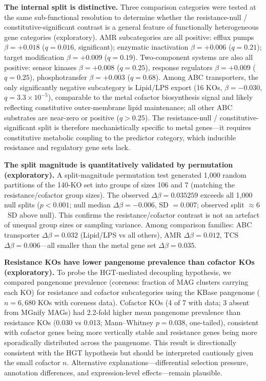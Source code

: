 \documentclass[times]{zHenriquesLab-StyleBioRxiv}
\begin{document}
\textbf{The internal split is distinctive.} Three comparison categories were
tested at the same sub-functional resolution to determine whether the
resistance-null / constitutive-significant contrast is a general feature of
functionally heterogeneous gene categories (exploratory). AMR
subcategories are all positive: efflux pumps $\beta = +0.018$ ($q = 0.016$,
significant); enzymatic inactivation $\beta = +0.006$ ($q = 0.21$); target
modification $\beta = +0.009$ ($q = 0.19$). Two-component systems are also all
positive: sensor kinases $\beta = +0.008$ ($q = 0.25$), response regulators
$\beta = +0.009$ ($q = 0.25$), phosphotransfer $\beta = +0.003$ ($q = 0.68$).
Among ABC transporters, the only significantly negative subcategory is Lipid/LPS
export (16 KOs, $\beta = -0.030$, $q = 3.3 \times 10^{-5}$), comparable to
the metal cofactor biosynthesis signal and likely reflecting constitutive
outer-membrane lipid maintenance; all other ABC
substrates are near-zero or positive ($q > 0.25$). The resistance-null /
constitutive-significant split is therefore mechanistically specific to metal
genes---it requires constitutive metabolic coupling to the predictor category,
which inducible resistance and regulatory gene sets lack.

\textbf{The split magnitude is quantitatively validated by permutation (exploratory).} A split-magnitude permutation test generated 1,000 random
partitions of the 140-KO set into groups of sizes 106 and 7 (matching the
resistance/cofactor group sizes). The observed $\Delta\beta = 0.035259$
exceeds all 1,000 null splits ($p < 0.001$; null median $\Delta\beta =
-0.006$, SD $= 0.007$; observed split $\approx 6$~SD above null). This
confirms the resistance/cofactor contrast is not an artefact of unequal group
sizes or sampling variance. Among comparison families: ABC transporter $\Delta\beta
= 0.032$ (Lipid/LPS vs all others), AMR $\Delta\beta = 0.012$, TCS $\Delta\beta
= 0.006$---all smaller than the metal gene set $\Delta\beta = 0.035$.

\textbf{Resistance KOs have lower pangenome prevalence than cofactor KOs (exploratory).}
To probe the HGT-mediated decoupling hypothesis, we compared pangenome prevalence
(coreness: fraction of MAG clusters carrying each KO) for resistance and cofactor
subcategories using the KBase pangenome ($n = 6{,}680$ KOs with coreness data).
Cofactor KOs (4 of 7 with data; 3 absent from MGnify MAGs) had 2.2-fold higher
mean pangenome prevalence than resistance KOs (0.030 vs 0.013;
Mann--Whitney $p = 0.038$, one-tailed), consistent with cofactor genes being
more vertically stable and resistance genes being more sporadically distributed
across the pangenome. This result is directionally consistent with the HGT
hypothesis but should be interpreted cautiously given the small cofactor $n$.
Alternative explanations---differential selection pressure, annotation differences,
and expression-level effects---remain plausible.
\end{document}
